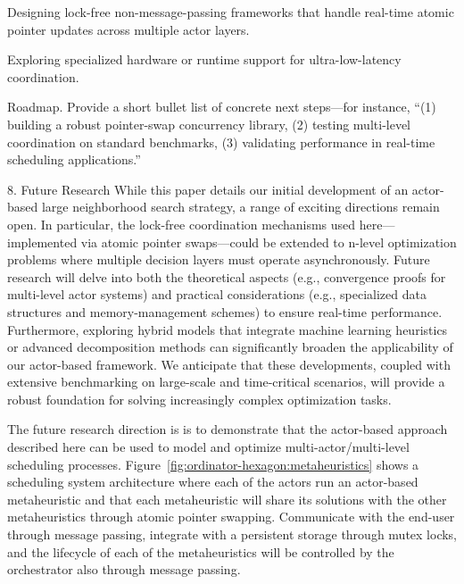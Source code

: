 Designing lock-free non-message-passing frameworks that handle
real-time atomic pointer updates across multiple actor layers. 

Exploring specialized hardware or runtime support for ultra-low-latency
coordination.

Roadmap. Provide a short bullet list of concrete next steps—for instance, “(1)
building a robust pointer-swap concurrency library, (2) testing multi-level
coordination on standard benchmarks, (3) validating performance in real-time
scheduling applications.”

8. Future Research
While this paper details our initial development of an actor-based large
neighborhood search strategy, a range of exciting directions remain open. In
particular, the lock-free coordination mechanisms used here—implemented via
atomic pointer swaps—could be extended to n-level optimization problems where
multiple decision layers must operate asynchronously. Future research will delve
into both the theoretical aspects (e.g., convergence proofs for multi-level
actor systems) and practical considerations (e.g., specialized data structures
and memory-management schemes) to ensure real-time performance. Furthermore,
exploring hybrid models that integrate machine learning heuristics or advanced
decomposition methods can significantly broaden the applicability of our
actor-based framework. We anticipate that these developments, coupled with
extensive benchmarking on large-scale and time-critical scenarios, will provide
a robust foundation for solving increasingly complex optimization tasks.

\label{sec:discussion:future_research}
The future research direction is is to demonstrate that
the actor-based approach described here can be used to model and optimize 
multi-actor/multi-level scheduling processes. 
Figure~\ref{fig:ordinator-hexagon:metaheuristics}
shows a scheduling system architecture where each of the actors run an actor-based metaheuristic
and that each metaheuristic will share its solutions with the other
metaheuristics through atomic pointer swapping. Communicate with the end-user
through message passing, integrate with a persistent storage through mutex
locks, and the lifecycle of each of the metaheuristics will be controlled by
the orchestrator also through message passing. 

